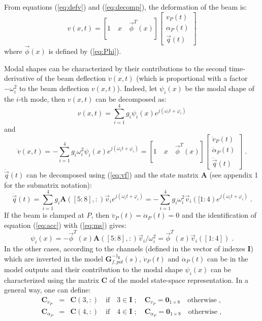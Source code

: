 From equations (\ref{eq:defv}) and  (\ref{eq:decomp}), the deformation of the beam is:
\[
v(x,t)=[1\quad x \quad \vec{\phi}^T(x)]\left[\begin{array}{c} v_P(t) \\ \alpha_P(t) \\ \vec{q}(t)\end{array}\right]
\]
where $\vec{\phi}(x)$ is defined by (\ref{eq:Phi}). 

Modal shapes can be characterized by their contributions to the second time-derivative of the beam deflection $\ddot{v}(x,t)$ (which is proportional with  a factor $-\omega_i^2$ to the beam deflection $v(x,t)$). Indeed, let $\psi_i(x)$ be the modal shape of the $i$-th mode, then $v(x,t)$ can be decomposed as:
\[
v(x,t)=\sum_{i=1}^4g_i\psi_i(x)e^{j(\omega_it+\varphi_i)}
\]
and
\begin{equation}\label{eq:acc}
\ddot{v}(x,t)=-\sum_{i=1}^4g_i\omega_i^2\psi_i(x)e^{j(\omega_it+\varphi_i)}=[1\quad x \quad \vec{\phi}^T(x)]\left[\begin{array}{c} \ddot{v}_P(t) \\ \ddot{\alpha}_P(t) \\ \ddot{\vec{q}}(t)\end{array}\right]\;.
\end{equation}
$\ddot{\vec{q}}(t)$ can be decomposed using (\ref{eq:vf}) and the state matrix $\mathbf{A}$ (see appendix 1 for the submatrix notation):
\begin{equation}\label{eq:ms}
\ddot{\vec{q}}(t)=\sum_{i=1}^4g_i\mathbf{A}([5:8],:)\vec{v}_ie^{j(\omega_it+\varphi_i)}=-\sum_{i=1}^4g_i\omega_i^2\vec{v}_i([1:4)e^{j(\omega_it+\varphi_i)}\;.
\end{equation}
If the beam is clamped at $P$, then $\ddot{v}_P(t)= \ddot{\alpha}_P(t)=0$ and the identification of equation (\ref{eq:acc}) with (\ref{eq:ms}) gives:
\[
\psi_i(x)=-\vec{\phi}^T(x)\mathbf{A}([5:8],:)\vec{v}_i/\omega_i^2=\vec{\phi}^T(x)\vec{v}_i([1:4])\;.
\]
In the other cases, according to the channels (defined in the vector of indexes  $\mathbf{I}$) which are inverted in the model  $\mathbf{G}_{f,pol}^{-1_{\mathbf{I}}}(s)$, $\ddot{v}_P(t)$ and $\ddot{\alpha}_P(t)$ can be in the model outputs and their contribution to the modal shape $\psi_i(x)$ can be characterized using the matrix $\mathbf{C}$ of the model state-space representation. In a general way, one can define:
\begin{eqnarray}\nonumber
\mathbf{C}_{v_P}&=&\mathbf{C}(3,:)\quad\mbox{if}\quad 3\in\mathbf{I}\;;\quad \mathbf{C}_{v_P}=\mathbf{0}_{1\times 8}\quad\mbox{otherwise}\;,\\\nonumber
\mathbf{C}_{\alpha_P}&=&\mathbf{C}(4,:)\quad\mbox{if}\quad 4\in\mathbf{I}\;;\quad \mathbf{C}_{\alpha_P}=\mathbf{0}_{1\times 8}\quad\mbox{otherwise}\;,
\end{eqnarray}
